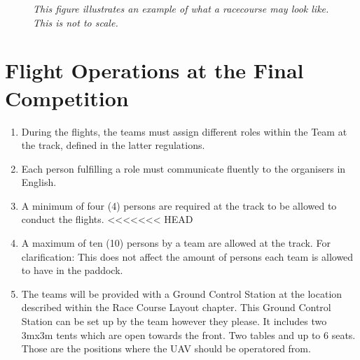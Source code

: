     \begin{figure}[h!]
      \centering
     \caption{\textit{This figure illustrates an example of what a racecourse may look like. This is not to scale.}}
     \end{figure}


    \section{Flight Operations at the Final Competition}
    \begin{enumerate}
      \item During the flights, the teams must assign different roles within the Team at the track, defined in the latter regulations.
      \item Each person fulfilling a role must communicate fluently to the organisers in English.
      \item A minimum of four (4) persons are required at the track to be allowed to conduct the flights.
<<<<<<< HEAD
      \item A maximum of ten (10) persons by a team are allowed at the track. For clarification: This does not affect the amount of persons each team is allowed to have in the paddock.  
      \item The teams will be provided with a Ground Control Station at the location described within the Race Course Layout chapter. This Ground Control Station can be set up by the team however they please. It includes two 3mx3m tents which are open towards the front. Two tables and up to 6 seats. Those are the positions where the UAV should be operatored from.
    \end{enumerate}

